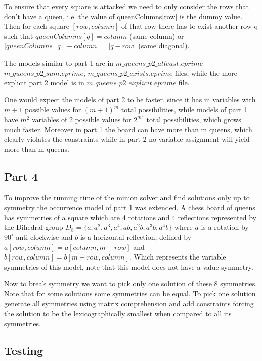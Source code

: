 \documentclass{article}
\begin{document}
To ensure that every square is attacked we need to only consider the rows that don't have a queen, i.e. the value of queenColumns[row] is the dummy value. Then for each square $[row, column]$ of that row there has to exist another row q such that $queenColumns[q] = column$ (same column) or $|queenColumns[q] - column| = |q - row|$ (same diagonal).

The models similar to part 1 are in $m\_queens\_p2\_atleast.eprime$ $m\_queens\_p2\_sum.eprime$, \newline $m\_queens\_p2\_exists.eprime$ files, while the more explicit part 2 model is in $m\_queens\_p2\_explicit.eprime$ file.

One would expect the models of part 2 to be faster, since it has m variables with $m+1$ possible values for $(m+1)^m$ total possibilities, while models of part 1 have $m^2$ variables of 2 possible values for $2^{m^2}$ total possibilities, which grows much faster. Moreover in part 1 the board can have more than m queens, which clearly violates the constraints while in part 2 no variable assignment will yield more than m queens.

\subsection{Part 4}

To improve the running time of the minion solver and find solutions only up to symmetry the occurrence model of part 1 was extended. A chess board of queens has symmetries of a square which are 4 rotations and 4 reflections represented by the Dihedral group $D_8=\{a, a^2, a^3, a^4, ab, a^2b, a^3b, a^4b\}$ where $a$ is a rotation by $90^\circ$ anti-clockwise and $b$ is a horizontal reflection, defined by $a[row, column]=a[column, m - row]$ and $b[row, column]=b[m - row, column]$. Which represents the variable symmetries of this model, note that this model does not have a value symmetry.

Now to break symmetry we want to pick only one solution of these 8 symmetries. Note that for some solutions some symmetries can be equal. To pick one solution generate all symmetries using matrix comprehension and add constraints forcing the solution to be the lexicographically smallest when compared to all its symmetries.

\subsection{Testing}
\end{document}
